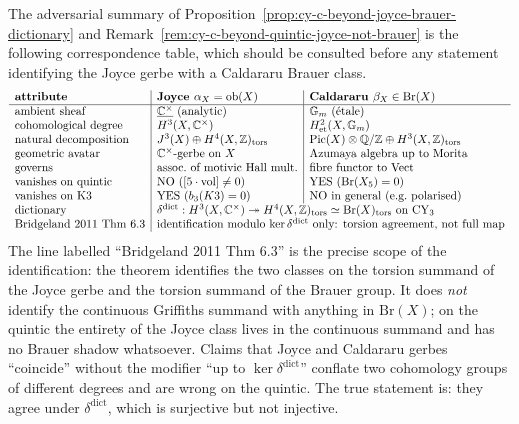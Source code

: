 \begin{remark}
\label{rem:cy-c-beyond-joyce-brauer-dictionary-table}
The adversarial summary of
Proposition~\ref{prop:cy-c-beyond-joyce-brauer-dictionary} and
Remark~\ref{rem:cy-c-beyond-quintic-joyce-not-brauer} is the following
correspondence table, which should be consulted before any statement
identifying the Joyce gerbe with a Caldararu Brauer class.
\[
\begin{array}{l|l|l}
\text{\textbf{attribute}} & \text{\textbf{Joyce $\alpha_X = \mathrm{ob}(X)$}} & \text{\textbf{Caldararu $\beta_X \in \mathrm{Br}(X)$}} \\\hline
\text{ambient sheaf} & \underline{\mathbb{C}^\times} \text{ (analytic)} & \mathbb{G}_m \text{ (\'etale)} \\
\text{cohomological degree} & H^3(X, \mathbb{C}^\times) & H^2_{\mathrm{et}}(X, \mathbb{G}_m) \\
\text{natural decomposition} & J^3(X) \oplus H^4(X, \mathbb{Z})_{\mathrm{tors}} & \mathrm{Pic}(X) \otimes \mathbb{Q}/\mathbb{Z} \oplus H^3(X, \mathbb{Z})_{\mathrm{tors}} \\
\text{geometric avatar} & \mathbb{C}^\times\text{-gerbe on } X & \text{Azumaya algebra up to Morita} \\
\text{governs} & \text{assoc.\ of motivic Hall mult.} & \text{fibre functor to Vect} \\
\text{vanishes on quintic} & \text{NO } ([5 \cdot \mathrm{vol}] \ne 0) & \text{YES } (\mathrm{Br}(X_5) = 0) \\
\text{vanishes on K3} & \text{YES } (b_3(K3) = 0) & \text{NO in general (e.g.\ polarised)} \\
\text{dictionary} & \multicolumn{2}{l}{\delta^{\mathrm{dict}} : H^3(X, \mathbb{C}^\times) \twoheadrightarrow H^4(X, \mathbb{Z})_{\mathrm{tors}} \simeq \mathrm{Br}(X)_{\mathrm{tors}} \text{ on CY}_3} \\
\text{Bridgeland 2011 Thm 6.3} & \multicolumn{2}{l}{\text{identification modulo $\ker \delta^{\mathrm{dict}}$ only: torsion agreement, not full map}}
\end{array}
\]
The line labelled ``Bridgeland 2011 Thm 6.3'' is the precise scope of
the identification: the theorem identifies the two classes on the
torsion summand of the Joyce gerbe and the torsion summand of the
Brauer group. It does \emph{not} identify the continuous Griffiths
summand with anything in $\mathrm{Br}(X)$; on the quintic the entirety
of the Joyce class lives in the continuous summand and has no Brauer
shadow whatsoever. Claims that Joyce and Caldararu gerbes ``coincide''
without the modifier ``up to $\ker \delta^{\mathrm{dict}}$'' conflate
two cohomology groups of different degrees and are wrong on the
quintic. The true statement is: they agree under $\delta^{\mathrm{dict}}$,
which is surjective but not injective.
\end{remark}


